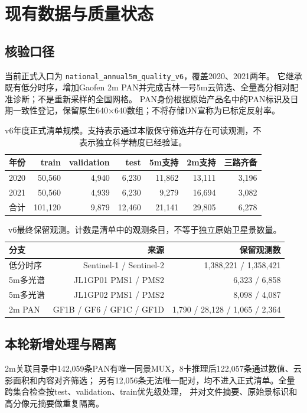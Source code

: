 \documentclass[UTF8,fontset=fandol,zihao=5,a4paper]{ctexart}
\newcommand{\reportpage}{\clearpage}
\begin{document}
\reportpage
\section{现有数据与质量状态}
\subsection{核验口径}
当前正式入口为 \texttt{national\_annual5m\_quality\_v6}，覆盖2020、2021两年。
它继承既有低分时序，增加Gaofen 2m PAN并完成吉林一号5m云筛选、全量高分相对配准诊断；不是重新采样的全国网格。
PAN身份根据原始产品名中的PAN标识及日期一致性登记，保留原生640$\times$640数组；不将存储DN宣称为已标定反射率。

\begin{table}[h]
\caption{v6年度正式清单规模。支持表示通过本版保守筛选并存在可读观测，不表示独立科学精度已经验证。}
\centering\small
\begin{tabular}{lrrrrrr}
\toprule 年份 & train & validation & test & 5m支持 & 2m支持 & 三路齐备\\\midrule
2020 & 50,560 & 4,940 & 6,230 & 11,862 & 13,111 & 3,196\\
2021 & 50,560 & 4,939 & 6,230 & 9,279 & 16,694 & 3,082\\\midrule
合计 & 101,120 & 9,879 & 12,460 & 21,141 & 29,805 & 6,278\\\bottomrule
\end{tabular}
\end{table}

\begin{table}[h]
\caption{v6最终保留观测。计数是清单中的观测条目，不等于独立原始卫星景数量。}
\centering\small
\begin{tabular}{lrr}
\toprule 分支 & 来源 & 保留观测数\\\midrule
低分时序 & Sentinel-1 / Sentinel-2 & 1,388,221 / 1,358,421\\
5m多光谱 & JL1GP01 PMS1 / PMS2 & 6,323 / 6,858\\
5m多光谱 & JL1GP02 PMS1 / PMS2 & 8,098 / 4,087\\
2m PAN & GF1B / GF6 / GF1C / GF1D & 1,790 / 28,128 / 1,065 / 2,364\\\bottomrule
\end{tabular}
\end{table}

\subsection{本轮新增处理与隔离}
2m关联目录中142,059条PAN有唯一同景MUX，8卡推理后122,057条通过数值、云影面积和内容对齐筛选；
另有12,056条无法唯一配对，均不进入正式清单。全量跨集合检查按test、validation、train优先级处理，
并对文件摘要、原始景标识和高分像元摘要做重复隔离。
\end{document}
